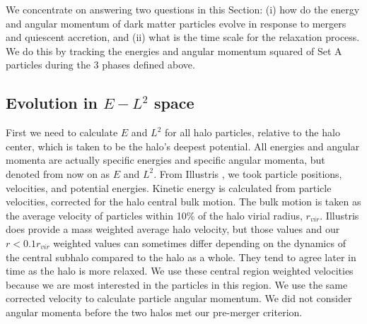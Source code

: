 \documentclass[a4paper,11pt]{article}
\begin{document}

We concentrate on answering two questions in this Section: (i) how do the energy and angular momentum of dark matter particles evolve in response to 
mergers and quiescent accretion, and (ii) what is the time scale for the relaxation process.  We do this by tracking the energies and angular momentum 
squared of Set A particles during the 3 phases defined above.

\subsection{Evolution in $E-L^2$ space}\label{EL2evo}

First we need to calculate $E$ and $L^2$ for all halo particles, relative to the halo center, which is taken to be the halo's deepest potential.  All energies 
and angular momenta are actually specific energies and specific angular momenta, but denoted from now on as $E$ and $L^2$.
From Illustris \citep{Nel15,Vog15}, we took particle positions, velocities, and potential energies.  Kinetic energy is calculated from particle 
velocities, corrected for the halo central bulk motion.  The bulk motion is taken as the average velocity of particles within 
10\% of the halo virial radius, $r_{vir}$.  Illustris does 
provide a mass weighted average halo velocity, but those values and our $r<0.1r_{vir}$ weighted values can sometimes differ depending on the dynamics of the 
central subhalo compared to the halo as a whole.  They tend to agree later in time as the halo is more relaxed.  We use these central region weighted 
velocities because we are most interested in the particles in this region.  We use the same corrected velocity to 
calculate particle angular momentum.  We did not consider angular momenta before the two halos met our pre-merger criterion. 
\end{document}
